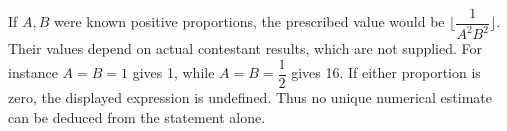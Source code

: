 If $A,B$ were known positive proportions, the prescribed value would be $\lfloor\dfrac{1}{A^2B^2}\rfloor$. Their values depend on actual contestant results, which are not supplied. For instance $A=B=1$ gives 1, while $A=B=\dfrac{1}{2}$ gives 16. If either proportion is zero, the displayed expression is undefined. Thus no unique numerical estimate can be deduced from the statement alone.
